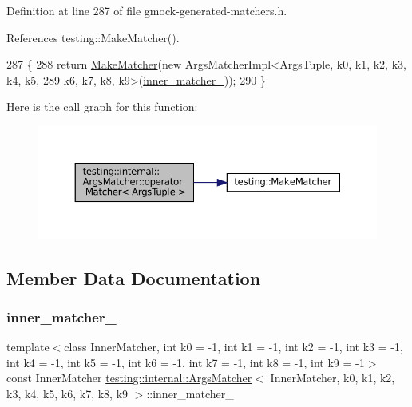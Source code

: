 Definition at line 287 of file gmock-\/generated-\/matchers.\+h.



References testing\+::\+Make\+Matcher().


\begin{DoxyCode}
287                                       \{
288     \textcolor{keywordflow}{return} \hyperlink{namespacetesting_a37fd8029ac00e60952440a3d9cca8166}{MakeMatcher}(\textcolor{keyword}{new} ArgsMatcherImpl<ArgsTuple, k0, k1, k2, k3, k4, k5,
289         k6, k7, k8, k9>(\hyperlink{classtesting_1_1internal_1_1ArgsMatcher_ac76e55e4b52e18fa0c57aad4814a8a70}{inner\_matcher\_}));
290   \}
\end{DoxyCode}
Here is the call graph for this function\+:
\nopagebreak
\begin{figure}[H]
\begin{center}
\leavevmode
\includegraphics[width=350pt]{classtesting_1_1internal_1_1ArgsMatcher_ad55698b0de384a9d8875cef5b172cb4a_cgraph}
\end{center}
\end{figure}


\subsection{Member Data Documentation}
\mbox{\label{classtesting_1_1internal_1_1ArgsMatcher_ac76e55e4b52e18fa0c57aad4814a8a70}} 
\subsubsection{\texorpdfstring{inner\+\_\+matcher\+\_\+}{inner\_matcher\_}}
{\footnotesize\ttfamily template$<$class Inner\+Matcher, int k0 = -\/1, int k1 = -\/1, int k2 = -\/1, int k3 = -\/1, int k4 = -\/1, int k5 = -\/1, int k6 = -\/1, int k7 = -\/1, int k8 = -\/1, int k9 = -\/1$>$ \\
const Inner\+Matcher \hyperlink{classtesting_1_1internal_1_1ArgsMatcher}{testing\+::internal\+::\+Args\+Matcher}$<$ Inner\+Matcher, k0, k1, k2, k3, k4, k5, k6, k7, k8, k9 $>$\+::inner\+\_\+matcher\+\_\+\hspace{0.3cm}{\ttfamily [private]}}



